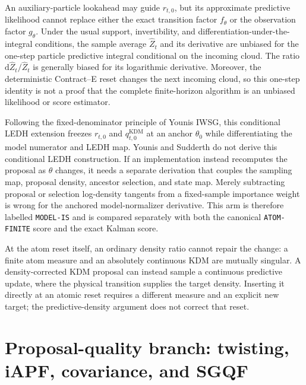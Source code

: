 \documentclass[11pt]{article}
\newcommand{\dd}{\mathrm{d}}
\newcommand{\KDM}{\ensuremath{\mathrm{KDM}}}
\begin{document}
An auxiliary-particle lookahead may guide $r_{t,0}$, but its approximate
predictive likelihood cannot replace either the exact transition factor
$f_\theta$ or the observation factor $g_\theta$.  Under the usual support,
invertibility, and differentiation-under-the-integral conditions, the sample
average $\widehat Z_t$ and its derivative are unbiased for the one-step
particle predictive integral conditional on the incoming cloud.  The ratio
$\dd\widehat Z_t/\widehat Z_t$ is generally biased for its logarithmic
derivative.  Moreover, the deterministic Contract--E reset changes the next
incoming cloud, so this one-step identity is not a proof that the complete
finite-horizon algorithm is an unbiased likelihood or score estimator.

Following the fixed-denominator principle of Younis IWSG, this conditional
LEDH extension freezes $r_{t,0}$ and $q^{\KDM}_{t,0}$ at an anchor $\theta_0$ while
differentiating the model numerator and LEDH map.  Younis and Sudderth do not
derive this conditional LEDH construction.  If an implementation instead
recomputes the proposal as $\theta$ changes, it needs a separate derivation
that couples the sampling map, proposal density, ancestor selection, and state
map.  Merely subtracting proposal or selection log-density tangents from a
fixed-sample importance weight is wrong for the anchored model-normalizer
derivative.  This arm is therefore labelled
\texttt{MODEL-IS} and is compared separately with both the canonical
\texttt{ATOM-FINITE} score and the exact Kalman score.

At the atom reset itself, an ordinary density ratio cannot repair the change:
a finite atom measure and an absolutely continuous KDM are mutually singular.
A density-corrected KDM proposal can instead sample a continuous predictive
update, where the physical transition supplies the target density. Inserting
it directly at an atomic reset requires a different measure and an explicit
new target; the predictive-density argument does not correct that reset.

\section{Proposal-quality branch: twisting, iAPF, covariance, and SGQF}
\label{sec:proposal-quality}
\end{document}
